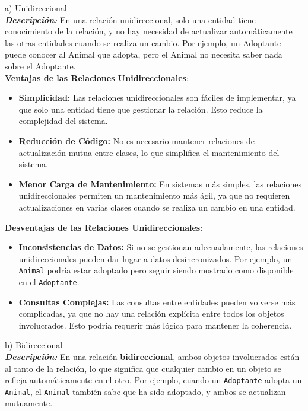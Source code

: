 \textbf{}{a) Unidireccional}\\

\textit{\textbf{Descripción:} } 
En una relación unidireccional, solo una entidad tiene conocimiento de la relación, y no hay necesidad de actualizar automáticamente las otras entidades cuando se realiza un cambio. Por ejemplo, un Adoptante puede conocer al Animal que adopta, pero el Animal no necesita saber nada sobre el Adoptante.\\

\textbf{Ventajas de las Relaciones Unidireccionales}:
\begin{itemize}
    \item \textbf{Simplicidad:} Las relaciones unidireccionales son fáciles de implementar, ya que solo una entidad tiene que gestionar la relación. Esto reduce la complejidad del sistema.
    \item \textbf{Reducción de Código:} No es necesario mantener relaciones de actualización mutua entre clases, lo que simplifica el mantenimiento del sistema.
    \item \textbf{Menor Carga de Mantenimiento:} En sistemas más simples, las relaciones unidireccionales permiten un mantenimiento más ágil, ya que no requieren actualizaciones en varias clases cuando se realiza un cambio en una entidad.
\end{itemize}

\textbf{Desventajas de las Relaciones Unidireccionales}:
\begin{itemize}
    \item \textbf{Inconsistencias de Datos:} Si no se gestionan adecuadamente, las relaciones unidireccionales pueden dar lugar a datos desincronizados. Por ejemplo, un \texttt{Animal} podría estar adoptado pero seguir siendo mostrado como disponible en el \texttt{Adoptante}.
    \item \textbf{Consultas Complejas:} Las consultas entre entidades pueden volverse más complicadas, ya que no hay una relación explícita entre todos los objetos involucrados. Esto podría requerir más lógica para mantener la coherencia.
\end{itemize}

\textbf{}{b) Bidireccional}\\

\textit{\textbf{Descripción:} } 
En una relación \textbf{bidireccional}, ambos objetos involucrados están al tanto de la relación, lo que significa que cualquier cambio en un objeto se refleja automáticamente en el otro. Por ejemplo, cuando un \texttt{Adoptante} adopta un \texttt{Animal}, el \texttt{Animal} también sabe que ha sido adoptado, y ambos se actualizan mutuamente.\\

